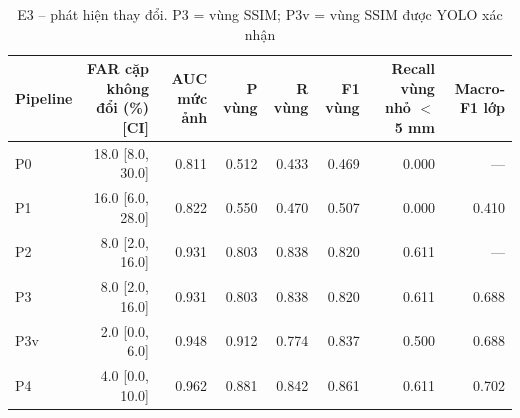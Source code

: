 \begin{table}[t]
\centering
\caption{E3 – phát hiện thay đổi. P3 = vùng SSIM; P3v = vùng SSIM được YOLO xác nhận}
\label{tab:e3}
\begin{tabular}{lrrrrrrr}
\toprule
Pipeline & FAR cặp không đổi (\%) [CI] & AUC mức ảnh & P vùng & R vùng & F1 vùng & Recall vùng nhỏ $<$ 5 mm & Macro-F1 lớp \\
\midrule
P0 & 18.0 [8.0, 30.0] & 0.811 & 0.512 & 0.433 & 0.469 & 0.000 & --- \\
P1 & 16.0 [6.0, 28.0] & 0.822 & 0.550 & 0.470 & 0.507 & 0.000 & 0.410 \\
P2 & 8.0 [2.0, 16.0] & 0.931 & 0.803 & 0.838 & 0.820 & 0.611 & --- \\
P3 & 8.0 [2.0, 16.0] & 0.931 & 0.803 & 0.838 & 0.820 & 0.611 & 0.688 \\
P3v & 2.0 [0.0, 6.0] & 0.948 & 0.912 & 0.774 & 0.837 & 0.500 & 0.688 \\
P4 & 4.0 [0.0, 10.0] & 0.962 & 0.881 & 0.842 & 0.861 & 0.611 & 0.702 \\
\bottomrule
\end{tabular}
\end{table}

